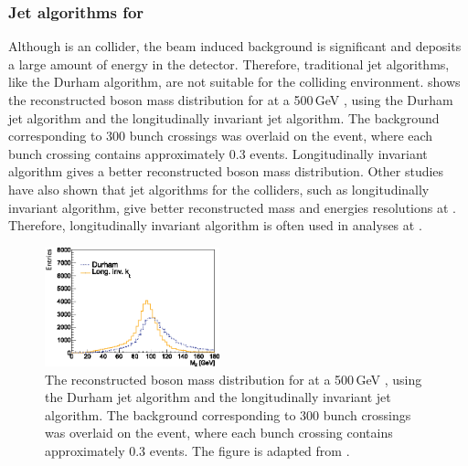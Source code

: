 \subsubsection{Jet algorithms for \CLIC}

Although \CLIC is an \ee collider, the  beam induced background is significant and deposits a large amount of energy in the detector. Therefore, traditional \ee jet algorithms, like the Durham algorithm, are not suitable for the \CLIC colliding environment.  shows the reconstructed \PZ boson mass distribution for  at a 500\,GeV \CLIC \cite{Boronat:2014hva}, using the Durham jet algorithm and the longitudinally invariant \kt jet algorithm. The \ggHad background corresponding to 300 bunch crossings was overlaid on the event, where each bunch crossing contains approximately 0.3 \ggHad events. Longitudinally invariant \kt algorithm gives a better  reconstructed \PZ boson mass distribution. Other studies \cite{Linssen:2012hp,LCD-Note-2010-006} have also shown that jet algorithms for the \pp colliders, such as  longitudinally invariant \kt algorithm,  give better reconstructed mass and energies resolutions at \CLIC. Therefore, longitudinally invariant \kt algorithm is often used in analyses at \CLIC.

\begin{figure}[tbph]
\centering

    \includegraphics[width=0.45\textwidth]{pandora/JetAlgsValencia}

\caption{The reconstructed \PZ boson mass distribution for  at a 500\,GeV \CLIC, using the Durham jet algorithm and the longitudinally invariant \kt jet algorithm. The \ggHad background corresponding to 300 bunch crossings was overlaid on the event, where each bunch crossing contains approximately 0.3 \ggHad events. The figure is adapted from \cite{Boronat:2014hva}.}
\label{fig:pandoraJetCompare}
\end{figure}



